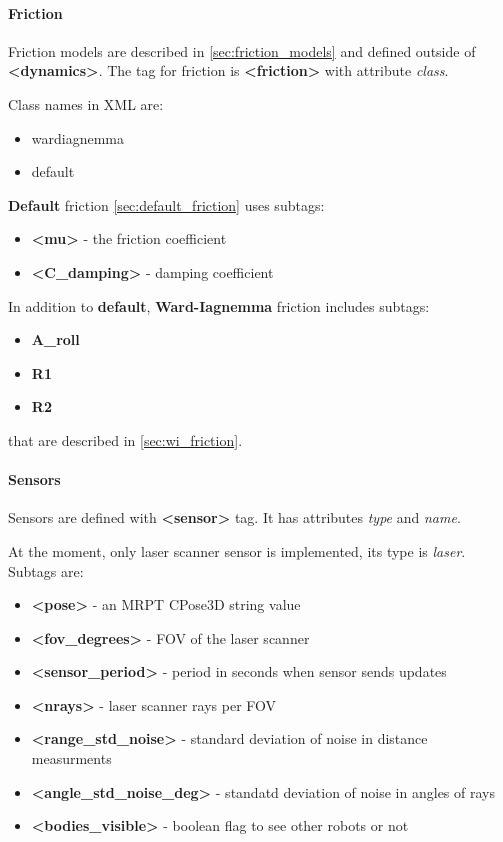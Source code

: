 \documentclass[a4paper,11pt]{article}
\begin{document}
\paragraph{Friction}
Friction models are described in \ref{sec:friction_models} and defined outside of \textbf{\textless dynamics\textgreater}.
The tag for friction is \textbf{\textless friction\textgreater} with attribute \textit{class}.

Class names in XML are:
\begin{itemize}
	\item wardiagnemma
	\item default
\end{itemize}

\textbf{Default} friction \ref{sec:default_friction} uses subtags:
\begin{itemize}
	\item \textbf{\textless mu\textgreater} - the friction coefficient
	\item \textbf{\textless C\_damping\textgreater} - damping coefficient
\end{itemize}

In addition to \textbf{default}, \textbf{Ward-Iagnemma} friction includes subtags:
\begin{itemize}
	\item \textbf{A\_roll}
	\item \textbf{R1}
	\item \textbf{R2}
\end{itemize}
that are described in \ref{sec:wi_friction}.

\paragraph{Sensors}
Sensors are defined with \textbf{\textless sensor\textgreater} tag. It has attributes \textit{type} and \textit{name}.

At the moment, only laser scanner sensor is implemented, its type is \textit{laser}.
Subtags are: 
\begin{itemize}
	\item \textbf{\textless pose\textgreater} - an MRPT CPose3D string value
	\item \textbf{\textless fov\_degrees\textgreater} - FOV of the laser scanner
	\item \textbf{\textless sensor\_period\textgreater} - period in seconds when sensor sends updates
	\item \textbf{\textless nrays\textgreater} - laser scanner rays per FOV
	\item \textbf{\textless range\_std\_noise\textgreater} - standard deviation of noise in distance measurments
	\item \textbf{\textless angle\_std\_noise\_deg\textgreater} - standatd deviation of noise in angles of rays
	\item \textbf{\textless bodies\_visible\textgreater} - boolean flag to see other robots or not
\end{itemize}
\end{document}
